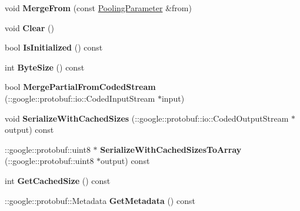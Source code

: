 \begin{DoxyCompactItemize}
\item 
\mbox{\label{classcaffe_1_1_pooling_parameter_a429a2822edb48ae92dac89fc5fac5836}} 
void {\bfseries Merge\+From} (const \mbox{\hyperlink{classcaffe_1_1_pooling_parameter}{Pooling\+Parameter}} \&from)
\item 
\mbox{\label{classcaffe_1_1_pooling_parameter_a2a0ccbdbefb47a4ed8b0bc917fbb1f3c}} 
void {\bfseries Clear} ()
\item 
\mbox{\label{classcaffe_1_1_pooling_parameter_a0d1a61fb90d5919f2ba2a0154ef29789}} 
bool {\bfseries Is\+Initialized} () const
\item 
\mbox{\label{classcaffe_1_1_pooling_parameter_a0d06ef242063cc2b47d10379d74f2855}} 
int {\bfseries Byte\+Size} () const
\item 
\mbox{\label{classcaffe_1_1_pooling_parameter_a29a5686aa5141ac667851878cd047dd6}} 
bool {\bfseries Merge\+Partial\+From\+Coded\+Stream} (\+::google\+::protobuf\+::io\+::\+Coded\+Input\+Stream $\ast$input)
\item 
\mbox{\label{classcaffe_1_1_pooling_parameter_ad7e1ee2b9ccde355f14bf8cfb50b60bc}} 
void {\bfseries Serialize\+With\+Cached\+Sizes} (\+::google\+::protobuf\+::io\+::\+Coded\+Output\+Stream $\ast$output) const
\item 
\mbox{\label{classcaffe_1_1_pooling_parameter_ab826a35fb2896ac134735abf0bbb9ac6}} 
\+::google\+::protobuf\+::uint8 $\ast$ {\bfseries Serialize\+With\+Cached\+Sizes\+To\+Array} (\+::google\+::protobuf\+::uint8 $\ast$output) const
\item 
\mbox{\label{classcaffe_1_1_pooling_parameter_a17bd715af5b48e43d5163c03e1749375}} 
int {\bfseries Get\+Cached\+Size} () const
\item 
\mbox{\label{classcaffe_1_1_pooling_parameter_a8260bb5cf2a64578ae3a2d2fa424f343}} 
\+::google\+::protobuf\+::\+Metadata {\bfseries Get\+Metadata} () const

\end{DoxyCompactItemize}
